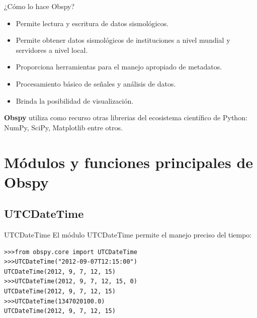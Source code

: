 \documentclass[11pt]{beamer}
\begin{document}
\begin{frame}{¿Cómo lo hace Obspy?}
\begin{itemize}
\item Permite lectura y escritura de datos sismológicos.
\pause
\item Permite obtener datos sismológicos de instituciones a nivel mundial y servidores a nivel local.
\pause
\item Proporciona herramientas para el manejo apropiado de metadatos.
\pause
\item Procesamiento básico de señales y análisis de datos.
\pause
\item Brinda la posibilidad de visualización.
\pause
\end{itemize}
\textbf{Obspy} utiliza como recurso otras librerias del ecosistema científico de Python: NumPy, SciPy, Matplotlib entre otros.
\end{frame}

\section{Módulos y funciones principales de Obspy}
\subsection{UTCDateTime}
\begin{frame}[fragile]{UTCDateTime}
El módulo UTCDateTime permite el manejo preciso del tiempo:
\begin{verbatim}
>>>from obspy.core import UTCDateTime
>>>UTCDateTime("2012-09-07T12:15:00")
UTCDateTime(2012, 9, 7, 12, 15)
>>>UTCDateTime(2012, 9, 7, 12, 15, 0)
UTCDateTime(2012, 9, 7, 12, 15)
>>>UTCDateTime(1347020100.0)
UTCDateTime(2012, 9, 7, 12, 15)
\end{verbatim}
\end{frame}
\end{document}
